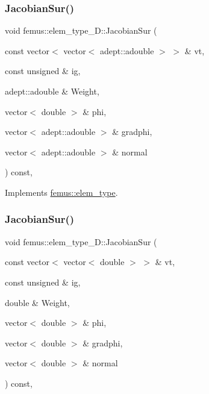 \mbox{\label{classfemus_1_1elem__type__1_d_a30e236ab3052558a85af26d862715540}} 
\subsubsection{\texorpdfstring{Jacobian\+Sur()}{JacobianSur()}\hspace{0.1cm}{\footnotesize\ttfamily [1/2]}}
{\footnotesize\ttfamily void femus\+::elem\+\_\+type\+\_\+D\+::\+Jacobian\+Sur (\begin{DoxyParamCaption}\item[{const vector$<$ vector$<$ adept\+::adouble $>$ $>$ \&}]{vt,  }\item[{const unsigned \&}]{ig,  }\item[{adept\+::adouble \&}]{Weight,  }\item[{vector$<$ double $>$ \&}]{phi,  }\item[{vector$<$ adept\+::adouble $>$ \&}]{gradphi,  }\item[{vector$<$ adept\+::adouble $>$ \&}]{normal }\end{DoxyParamCaption}) const\hspace{0.3cm}{\ttfamily [inline]}, {\ttfamily [virtual]}}



Implements \mbox{\hyperlink{classfemus_1_1elem__type_a293052fac0f51472150b1bf7365c6b18}{femus\+::elem\+\_\+type}}.

\mbox{\label{classfemus_1_1elem__type__1_d_a66b28ca6be3e79fe3bf08b2c856974dd}} 
\subsubsection{\texorpdfstring{Jacobian\+Sur()}{JacobianSur()}\hspace{0.1cm}{\footnotesize\ttfamily [2/2]}}
{\footnotesize\ttfamily void femus\+::elem\+\_\+type\+\_\+D\+::\+Jacobian\+Sur (\begin{DoxyParamCaption}\item[{const vector$<$ vector$<$ double $>$ $>$ \&}]{vt,  }\item[{const unsigned \&}]{ig,  }\item[{double \&}]{Weight,  }\item[{vector$<$ double $>$ \&}]{phi,  }\item[{vector$<$ double $>$ \&}]{gradphi,  }\item[{vector$<$ double $>$ \&}]{normal }\end{DoxyParamCaption}) const\hspace{0.3cm}{\ttfamily [inline]}, {\ttfamily [virtual]}}



